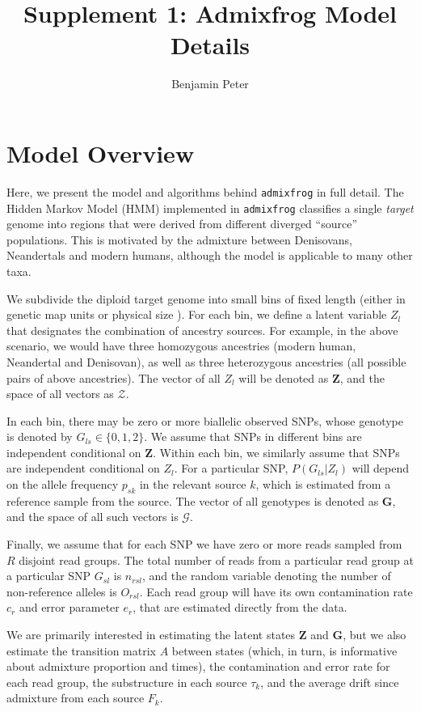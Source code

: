 \documentclass[10pt,a4paper]{article}
\author{Benjamin Peter}
\title{Supplement 1: Admixfrog Model Details}
\newcommand{\BFZ}{\mathbf{Z}}
\newcommand{\BFG}{\mathbf{G}}
\begin{document}
	\maketitle
\section*{Model Overview}
	Here, we present the model and algorithms behind \texttt{admixfrog} in full detail. The Hidden Markov Model (HMM) implemented in \texttt{admixfrog} classifies a single \emph{target} genome into regions that were derived from different diverged ``source'' populations. This is motivated by the admixture between Denisovans, Neandertals  and modern humans, although the model is applicable to many other taxa. 
	
	We subdivide the diploid target genome into small bins of fixed length (either in genetic map units or physical size ). For each bin, we define a latent variable $Z_l$ that designates the combination of ancestry sources. For example, in the above scenario, we would have three homozygous ancestries (modern human, Neandertal and Denisovan), as well as three heterozygous ancestries (all possible pairs of above ancestries). The vector of all $Z_l$ will be denoted as $\BFZ$, and the space of all vectors as $\mathcal{Z}$.
	
	In each bin, there may be zero or more biallelic observed SNPs, whose genotype is denoted by $G_{ls} \in \{0, 1, 2\}$. We assume that SNPs in different bins are independent conditional on $\BFZ$. Within each bin, we similarly assume that SNPs are independent conditional on $Z_l$. For a particular SNP, $P(G_{ls} | Z_l)$ will depend on the allele frequency $p_{sk}$ in the relevant source $k$, which is estimated from a reference sample from the source. The vector of all genotypes is denoted as $\BFG$, and the space of all such vectors is $\mathcal{G}$.
	
	Finally, we assume that for each SNP we have zero or more reads sampled from $R$ disjoint read groups. The total number of reads from a particular read group at a particular SNP $G_{sl}$ is $n_{rsl}$, and the random variable denoting the number of non-reference alleles is $O_{rsl}$. Each read group will have its own contamination rate $c_r$ and error parameter $e_r$, that are estimated directly from the data.
	
	We are primarily interested in estimating the latent states $\BFZ$ and $\BFG$, but we also estimate the transition matrix $A$ between states (which, in turn, is informative about admixture proportion and times), the contamination and error rate for each read group, the substructure in each source $\tau_k$, and the average drift since admixture from each source $F_k$. 
\end{document}
